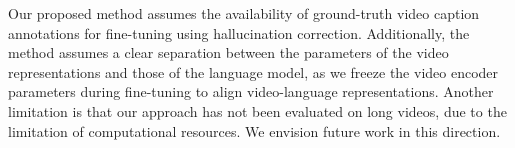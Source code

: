 Our proposed method assumes the availability of ground-truth video caption annotations for fine-tuning using hallucination correction. 
Additionally, the method assumes a clear separation between the parameters of the video representations and those of the language model, as we freeze the video encoder parameters during fine-tuning to align video-language representations. 
Another limitation is that our approach has not been evaluated on long videos, due to the limitation of computational resources. We envision future work in this direction. 

